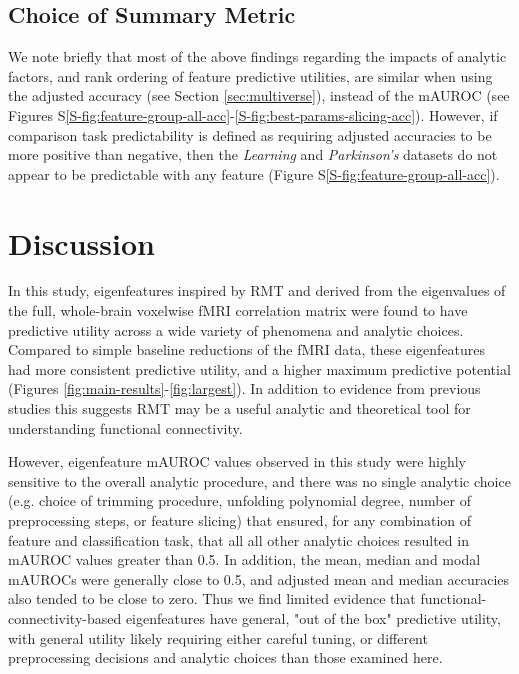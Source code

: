 \documentclass[12pt]{spieman}  %
\begin{document}
\begin{spacing}{2}
\subsection{Choice of Summary Metric}
We note briefly that most of the above findings regarding the impacts of
analytic factors, and rank ordering of feature predictive utilities, are
similar when using the adjusted accuracy (see Section \ref{sec:multiverse}),
instead of the mAUROC (see Figures
S\ref{S-fig:feature-group-all-acc}-\ref{S-fig:best-params-slicing-acc}).
However, if comparison task predictability is defined as requiring adjusted
accuracies to be more positive than negative, then the \textit{Learning} and
\textit{Parkinson's} datasets do not appear to be predictable with any feature
(Figure S\ref{S-fig:feature-group-all-acc}).


\section{Discussion}
\label{sec:discussion}

In this study, eigenfeatures inspired by RMT and derived from the eigenvalues
of the full, whole-brain voxelwise fMRI correlation matrix were found to have
predictive utility across a wide variety of phenomena and analytic choices.
Compared to simple baseline reductions of the fMRI data, these eigenfeatures
had more consistent predictive utility, and a higher maximum predictive
potential (Figures \ref{fig:main-results}-\ref{fig:largest}). In addition to
evidence from previous studies
\cite{sebaRandomMatrixAnalysis2003,wangRandomMatrixTheory2016,matharooSpontaneousBackpainAlters2020}
this suggests RMT may be a useful analytic and theoretical tool for
understanding functional connectivity.

However, eigenfeature mAUROC values observed in this study were highly
sensitive to the overall analytic procedure, and there was no single analytic
choice (e.g. choice of trimming procedure, unfolding polynomial degree, number
of preprocessing steps, or feature slicing) that ensured, for any combination
of feature and classification task, that all all other analytic choices
resulted in mAUROC values greater than 0.5. In addition, the mean, median and
modal mAUROCs were generally close to 0.5, and adjusted mean and median
accuracies also tended to be close to zero. Thus we find limited evidence that
functional-connectivity-based eigenfeatures have general, "out of the box"
predictive utility, with general utility likely requiring either careful
tuning, or different preprocessing decisions and analytic choices than those
examined here.




\end{spacing}
\end{document}

